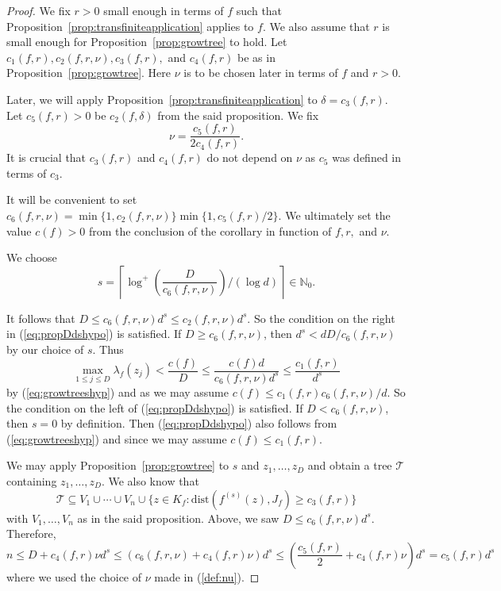 \documentclass[12pt,oneside,a4]{amsart}
\newcommand{\IN}{\mathbb{N}}
\newcommand{\cT}{\mathcal{T}}
\numberwithin{maincounter}{section}
\numberwithin{equation}{section}
\renewcommand{\subset}{\subseteq}
\begin{document}
\begin{proof}
  We fix $r > 0$ small enough in terms of $f$ such that
  Proposition~\ref{prop:transfiniteapplication} applies to $f$. We also
  assume that $r$ is small enough for
  Proposition~\ref{prop:growtree} to hold.
  Let
  $c_1(f,r),c_2(f,r,\nu),c_3(f,r),$ and
  $c_4(f,r)$ be as in Proposition~\ref{prop:growtree}. Here $\nu$ is to be chosen
  later in terms of $f$ and $r>0$.

  Later, we will apply Proposition~\ref{prop:transfiniteapplication}
  to $\delta=c_3(f,r)$. Let $c_5(f,r)>0$ be
  $c_2(f,\delta)$ from the said proposition.
  We fix
  \begin{equation}
    \label{def:nu}
    \nu=\frac{c_5(f,r)}{2c_4(f,r)}.
  \end{equation}
  It is crucial
  that $c_3(f,r)$ and $c_4(f,r)$ do
  not depend on $\nu$ as $c_5$ was defined
  in terms of $c_3$.
  
  It will be convenient to set
  $c_6(f,r,\nu)=\min\{1,c_2(f,r,\nu)\}\min\{1,c_5(f,r)/2\}$.
  We ultimately set the value $c(f)>0$ from the conclusion of the
  corollary in function of $f,r,$ and $\nu$.

  We choose
  \begin{equation*}
    s = \left\lceil
    \log^+\left(\frac{D}{c_6(f,r,\nu)}\right)/(\log
  d)\right\rceil \in \IN_0. 
  \end{equation*}
  
  It follows that  $D\le c_6(f,r,\nu)d^s\le
  c_2(f,r,\nu)d^s$. So the  condition on the right
  in (\ref{eq:propDdshypo}) is satisfied.
  If $D\ge c_6(f,r,\nu)$, then  $d^s <
  {dD}/{c_6(f,r,\nu)}$ by our choice of $s$. 
  Thus
  $$\max_{1\le j\le D} \lambda_f(z_j)< \frac{c(f)}{D} \le
  \frac{c(f)d}{c_6(f,r,\nu)d^s} \le \frac{c_1(f,r)}{d^s}$$
  by (\ref{eq:growtreeshyp}) and
  as we may assume $c(f) \le c_1(f,r)c_6(f,r,\nu)/d$.
  So the  condition on the left of (\ref{eq:propDdshypo}) is satisfied.
  If $D<c_6(f,r,\nu)$, then $s=0$ by definition. Then
  (\ref{eq:propDdshypo})
  also follows from (\ref{eq:growtreeshyp}) and
  since we may assume $c(f)\le c_1(f,r)$.
  
  We may apply
  Proposition~\ref{prop:growtree} to $s$ and $z_1,\ldots,z_D$ and
  obtain a tree $\cT$ containing $z_1,\ldots,z_D$. We also know that
  \begin{equation*}
    \cT\subset V_1\cup\cdots\cup V_n \cup \{z\in K_f :
    \mathrm{dist}(f^{(s)}(z),J_f)\ge c_3(f,r)\}    
  \end{equation*}
  with  $V_1,\ldots,V_n$  as in the
  said proposition. Above, we
  saw $D\le c_6(f,r,\nu) d^s$. Therefore,
  $$n\le D+c_4(f,r) \nu d^s 
  \le (c_6(f,r,\nu)+c_4(f,r)\nu)d^s
  \le
  \left(\frac{c_5(f,r)}{2}+c_4(f,r)\nu\right)d^s =
  c_5(f,r)d^s$$
  where we used the choice of $\nu$ made in (\ref{def:nu}).


\end{proof}
\end{document}
